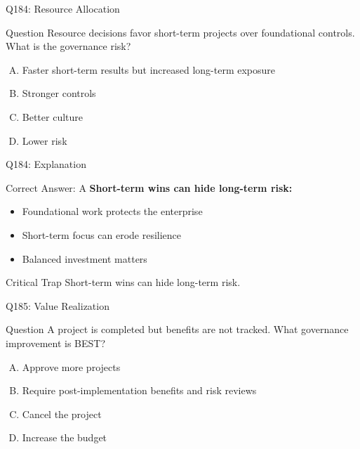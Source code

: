 \documentclass{beamer}
\begin{document}
	\begin{frame}{Q184: Resource Allocation}
		\begin{block}{Question}
			Resource decisions favor short-term projects over foundational controls. What is the governance risk?
		\end{block}
		\begin{enumerate}[(A)]
			\item Faster short-term results but increased long-term exposure
			\item Stronger controls
			\item Better culture
			\item Lower risk
		\end{enumerate}
	\end{frame}
	
	\begin{frame}{Q184: Explanation}
		\begin{block}{Correct Answer: A}
			\textbf{Short-term wins can hide long-term risk:}
			\begin{itemize}
				\item Foundational work protects the enterprise
				\item Short-term focus can erode resilience
				\item Balanced investment matters
			\end{itemize}
		\end{block}
		\begin{alertblock}{Critical Trap}
			Short-term wins can hide long-term risk.
		\end{alertblock}
	\end{frame}
	
	\begin{frame}{Q185: Value Realization}
		\begin{block}{Question}
			A project is completed but benefits are not tracked. What governance improvement is BEST?
		\end{block}
		\begin{enumerate}[(A)]
			\item Approve more projects
			\item Require post-implementation benefits and risk reviews
			\item Cancel the project
			\item Increase the budget
		\end{enumerate}
	\end{frame}
	
\end{document}
